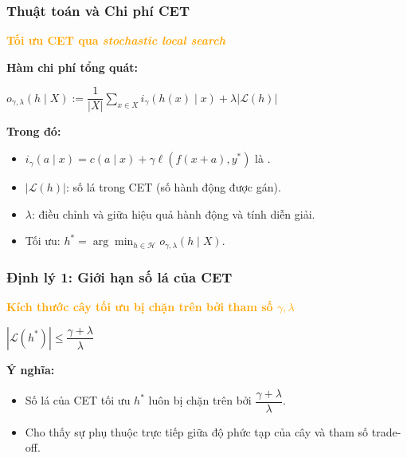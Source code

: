 \documentclass[notheorems, aspectratio=149]{beamer}
\begin{document}
\begin{frame}
    \frametitle{Thuật toán và Chi phí CET}

    \begin{tcolorbox}[custombox]
        \centering
        \textbf{\textcolor{orange}{Tối ưu CET qua \textit{stochastic local search}}}  
    \end{tcolorbox}

    \textbf{Hàm chi phí tổng quát:}
    \begin{center}
    \begin{highlightformula}
        $o_{\gamma, \lambda}(h \mid X) := 
        \dfrac{1}{|X|} \sum_{x \in X} i_\gamma(h(x) \mid x) + \lambda |\mathcal{L}(h)|$
    \end{highlightformula}
    \end{center}

    \textbf{Trong đó:}
    \begin{itemize}
        \item $i_\gamma(a \mid x) = c(a \mid x) + \gamma \ell(f(x+a), y^*)$ là .
        \item $|\mathcal{L}(h)|$: số lá trong CET (số hành động được gán).
        \item $\lambda$: điều chỉnh  và  giữa hiệu quả hành động và tính diễn giải.
        \item Tối ưu: $h^* = \arg\min_{h \in \mathcal{H}} o_{\gamma, \lambda}(h \mid X)$.
    \end{itemize}
\end{frame}

\begin{frame}
    \frametitle{Định lý 1: Giới hạn số lá của CET}

    \begin{tcolorbox}[custombox]
        \centering
        \textbf{\textcolor{orange}{Kích thước cây tối ưu bị chặn trên bởi tham số $\gamma, \lambda$}}
    \end{tcolorbox}

    \begin{center}
    \begin{highlightformula}
    $\displaystyle |\mathcal{L}(h^*)| \leq \dfrac{\gamma + \lambda}{\lambda}$
    \end{highlightformula}
    \end{center}
    
    \vspace{0.3cm}
    \textbf{Ý nghĩa:}
    \begin{itemize}
        \item Số lá của CET tối ưu $h^*$ luôn bị chặn trên bởi $\dfrac{\gamma + \lambda}{\lambda}$.
        \item Cho thấy sự phụ thuộc trực tiếp giữa độ phức tạp của cây và tham số trade-off.
    \end{itemize}
\end{frame}
\end{document}
